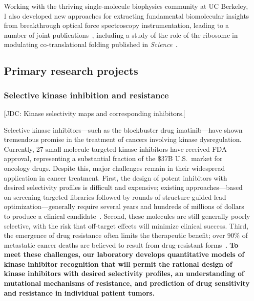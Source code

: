 \documentclass[10pt]{article}
\begin{document}
Working with the thriving single-molecule biophysics community at UC Berkeley, I also developed new approaches for extracting fundamental biomolecular insights from breakthrough optical force spectroscopy instrumentation, leading to a number of joint publications~\cite{elms:biophys-j:2012:constant-force-feedback,elms:pnas:2012:molten-globule,chodera:2011:rate-theory,bhmm}, including a study of the role of the ribosome in modulating co-translational folding published in \emph{Science}~\cite{kaiser:2011:ribosome-folding}.

\eject

\subsection*{Primary research projects}

\subsubsection*{Selective kinase inhibition and resistance}

{\color{red}[JDC: Kinase selectivity maps and corresponding inhibitors.]}

Selective kinase inhibitors---such as the blockbuster drug imatinib---have shown tremendous promise in the treatment of cancers involving kinase dysregulation.
Currently, 27 small molecule targeted kinase inhibitors have received FDA approval, representing a substantial fraction of the \$37B U.S.~market for oncology drugs.
Despite this, major challenges remain in their widespread application in cancer treatment.
First, the design of potent inhibitors with desired selectivity profiles is difficult and expensive; existing approaches---based on screening targeted libraries followed by rounds of structure-guided lead optimization---generally require several years and hundreds of millions of dollars to produce a clinical candidate~\cite{paul:2010:nrdd:pharma-research-development}.
Second, these molecules are still generally poorly selective, with the risk that off-target effects will minimize clinical success.
Third, the emergence of drug resistance often limits the therapeutic benefit; over 90\% of metastatic cancer deaths are believed to result from drug-resistant forms~\cite{longley-johnston:j-pathol:2005:drug-resistance}.
{\bf To meet these challenges, our laboratory develops quantitative models of kinase inhibitor recognition that will permit the rational design of kinase inhibitors with desired selectivity profiles, an understanding of mutational mechanisms of resistance, and prediction of drug sensitivity and resistance in individual patient tumors.}
\end{document}
